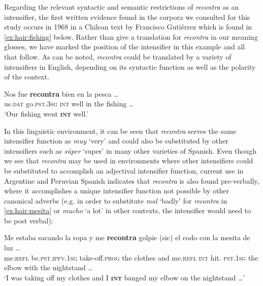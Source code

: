 \documentclass[output=paper,colorlinks,citecolor=brown,
]{langscibook}
\begin{document}
Regarding the relevant syntactic and semantic restrictions of \textit{recontra} as an intensifier, the first written evidence found in the corpora we consulted for this study occurs in 1968 in a Chilean  text by Francisco Gutiérrez which is found in \ref{ex:hair:fishing} below. Rather than give a translation for \textit{recontra} in our meaning glosses, we have marked the position of the intensifier in this example and all that follow. As can be noted, \textit{recontra} could be translated by a variety of intensifiers in English, depending on its syntactic function as well as the polarity of the context. 

\begin{exe}
\ex\label{ex:hair:fishing}
\gll Nos fue \textbf{recontra} bien en la pesca \ldots\\
us.\textsc{dat} go.\textsc{pst.3sg} \textsc{int} well in the fishing \ldots\\
\glt `Our fishing went \textbf{\textsc{int}} well.' \qquad \citep{RAECORDE}
\end{exe}


In this linguistic environment, it can be seen that \textit{recontra} serves the same intensifier function as \textit{muy} `very' and could also be substituted by other intensifiers such as \textit{súper} `super' in many other varieties of Spanish. Even though we see that \textit{recontra} may be used in environments where other intensifiers could be substituted to accomplish an adjectival intensifier function, current use in Argentine and Peruvian Spanish indicates that \textit{recontra} is also found pre-verbally, where it accomplishes a unique intensifier function not possible by other canonical adverbs (e.g. in order to substitute \textit{mal} 
`badly' for \textit{recontra} in \ref{ex:hair:mesita} or \textit{mucho} `a lot' in other contexts, the intensifier would need to be post verbal): 

\begin{exe}
\ex\label{ex:hair:mesita}
\gll Me  estaba	sacando la ropa y me \textbf{recontra} golpie (sic) el   codo   con  la 	mesita de luz \ldots \\
me.\textsc{refl} be.\textsc{pst.ipfv.1sg} take-off.\textsc{prog} the clothes and me.\textsc {refl} \textsc{int} hit. \textsc{pst.1sg} the elbow with the nightstand \ldots \\
\glt `I was taking off my clothes and I \textbf{\textsc{int}} banged my elbow on the nightstand \ldots' \qquad \citep{Twitter:Whatareyoudoing2018}
\end{exe}
\end{document}
